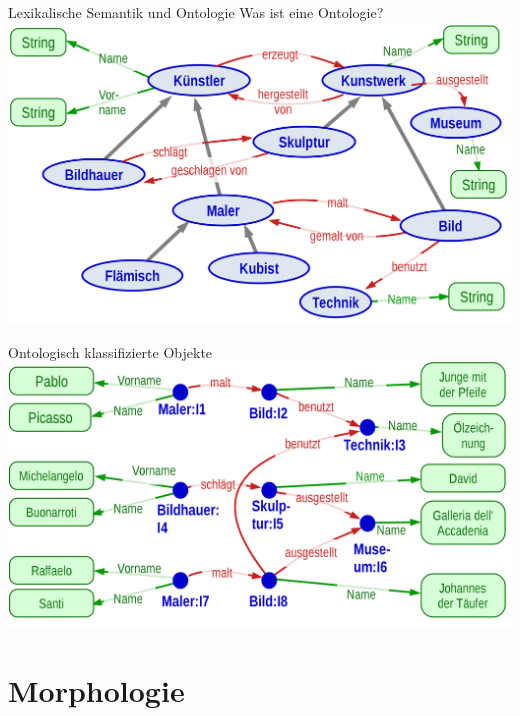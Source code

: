 \begin{frame}
  {Lexikalische Semantik und Ontologie}
  \onslide<+->
  Was ist eine Ontologie?\\
  \onslide<+->
  \Zeile
  \centering 
  \includegraphics[height=0.7\textheight]{graphics/onto_typ}\\
  \Viertelzeile
\end{frame}

\begin{frame}
  {Ontologisch klassifizierte Objekte}
  \onslide<+->
  \onslide<+->
  \centering
  \includegraphics[height=0.7\textheight]{graphics/onto_tok}\\
  \Viertelzeile
\end{frame}

\section{Morphologie}

